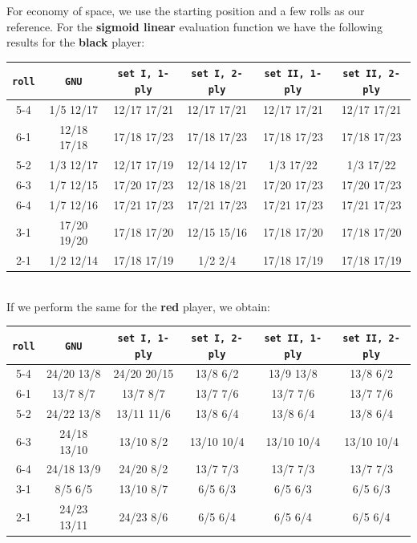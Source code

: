 \documentclass[11pt, a4paper, twoside]{amsart} %
\theoremstyle{definition}
\begin{document}
For economy of space, we use the starting position and a few rolls as our reference. For the \textbf{sigmoid linear} evaluation function we have the following results for the \textbf{black} player:
\begin{center}
\begin{tabular}{ | c | c | c | c | c | c | }
\hline
\texttt{roll} & \texttt{GNU} & \texttt{set I, 1-ply} & \texttt{set I, 2-ply} & \texttt{set II, 1-ply} & \texttt{set II, 2-ply}\\ \hline
5-4 & 1/5 12/17 & 12/17 17/21 & 12/17 17/21 & 12/17 17/21 & 12/17 17/21\\ \hline
6-1 & 12/18 17/18 & 17/18 17/23 & 17/18 17/23 & 17/18 17/23 & 17/18 17/23\\ \hline
5-2 & 1/3 12/17 & 12/17 17/19 & 12/14 12/17 & 1/3 17/22 & 1/3 17/22\\ \hline
6-3 & 1/7 12/15 & 17/20 17/23 & 12/18 18/21 & 17/20 17/23 & 17/20 17/23\\ \hline
6-4 & 1/7 12/16 & 17/21 17/23 & 17/21 17/23 & 17/21 17/23 & 17/21 17/23\\ \hline
3-1 & 17/20 19/20 & 17/18 17/20 & 12/15 15/16 & 17/18 17/20 & 17/18 17/20\\ \hline
2-1 & 1/2 12/14 & 17/18 17/19 & 1/2 2/4 & 17/18 17/19 & 17/18 17/19\\ \hline
\end{tabular}
\end{center}
\text{}\\
If we perform the same for the \textbf{red} player, we obtain:
\begin{center}
\begin{tabular}{ | c | c | c | c | c | c | }
\hline
\texttt{roll} & \texttt{GNU} & \texttt{set I, 1-ply} & \texttt{set I, 2-ply} & \texttt{set II, 1-ply} & \texttt{set II, 2-ply}\\ \hline
5-4 & 24/20 13/8 & 24/20 20/15 & 13/8 6/2 & 13/9 13/8 & 13/8 6/2\\ \hline
6-1 & 13/7 8/7 & 13/7 8/7 & 13/7 7/6 & 13/7 7/6 & 13/7 7/6\\ \hline
5-2 & 24/22 13/8 & 13/11 11/6 & 13/8 6/4 & 13/8 6/4 & 13/8 6/4\\ \hline
6-3 & 24/18 13/10 & 13/10 8/2 & 13/10 10/4 & 13/10 10/4 & 13/10 10/4\\ \hline
6-4 & 24/18 13/9 & 24/20 8/2 & 13/7 7/3 & 13/7 7/3 & 13/7 7/3\\ \hline
3-1 & 8/5 6/5 & 13/10 8/7 & 6/5 6/3 & 6/5 6/3 & 6/5 6/3\\ \hline
2-1 & 24/23 13/11 & 24/23 8/6 & 6/5 6/4 & 6/5 6/4 & 6/5 6/4\\ \hline
\end{tabular}
\end{center}
\end{document}
